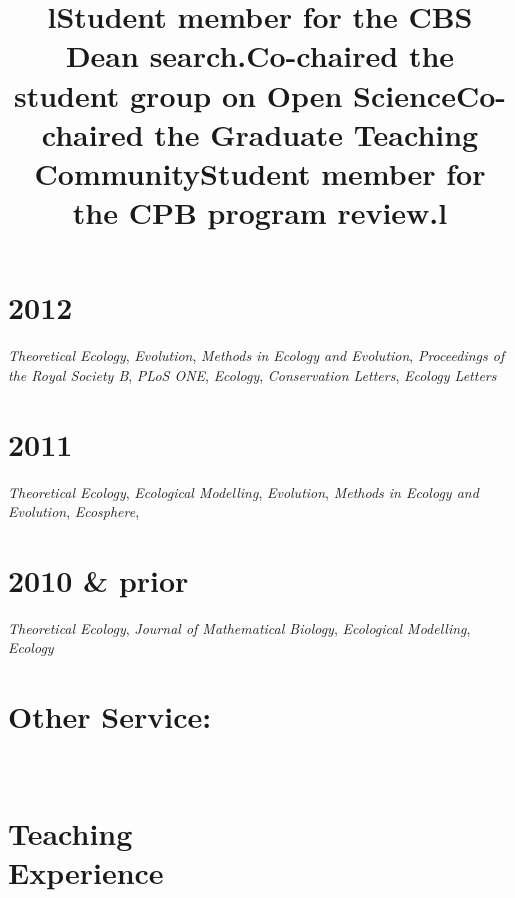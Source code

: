 \documentclass[margin]{res}
\begin{document}
\begin{resume}
\section{\textnormal{2012}}
\emph{Theoretical Ecology}, \emph{Evolution}, \emph{Methods in Ecology and Evolution}, \emph{Proceedings of the Royal Society B}, \emph{PLoS ONE}, \emph{Ecology}, \emph{Conservation Letters}, \emph{Ecology Letters} 

\section{\textnormal{2011}}
\emph{Theoretical Ecology}, \emph{Ecological Modelling}, \emph{Evolution}, \emph{Methods in Ecology and Evolution}, \emph{Ecosphere}, 

\section{\textnormal{2010 \& prior}}
\emph{Theoretical Ecology}, \emph{Journal of Mathematical Biology}, \emph{Ecological Modelling}, \emph{Ecology}

\section{Other Service:} 
\begin{format}
\title{l}\\
\body 
\end{format}

\title{Student  member for the CBS Dean search.}
\begin{position} \vspace{-.8cm} \end{position}
\title{Co-chaired the student group on Open Science}
\begin{position} \vspace{-.8cm} \end{position}
\title{Co-chaired the Graduate Teaching Community}
\begin{position} \vspace{-.8cm} \end{position}
\title{Student member for the CPB program review.}
\begin{position} \vspace{0cm} \end{position}


\section{Teaching\\Experience}
\begin{format}
\title{l}\\
\body
\end{format}


\end{resume}
\end{document}

